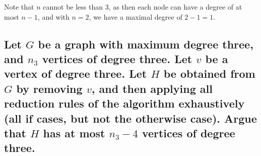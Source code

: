 \documentclass{article}
\begin{document}
Note that $n$ cannot be less than 3, as then each node can have a degree of at most $n-1$, and with $n=2$, we have a maximal degree of $2-1 = 1$.

\subsection{\textbf{Let $G$ be a graph with maximum degree three, and $n_3$ vertices of degree three. Let $v$ be a vertex of degree three. Let $H$ be obtained from $G$ by removing $v$, and then applying all reduction rules of the algorithm exhaustively (all if cases, but not the otherwise  case). Argue that $H$ has at most $n_3 - 4$ vertices of degree three.}}







\end{document}

